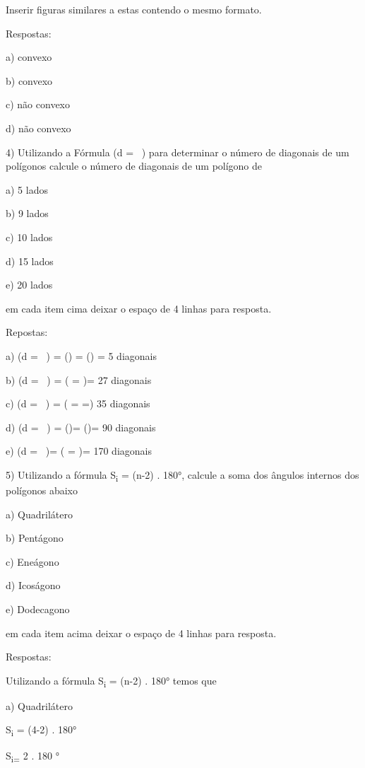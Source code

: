 Inserir figuras similares a estas contendo o mesmo formato.

Respostas:

a) convexo

b) convexo

c) não convexo

d) não convexo

4) Utilizando a Fórmula (d = \ ) para determinar o
número de diagonais de um polígonos calcule o número de diagonais de um
polígono de

a) 5 lados

b) 9 lados

c) 10 lados

d) 15 lados

e) 20 lados

em cada item cima deixar o espaço de 4 linhas para resposta.

Repostas:


a) (d = \ ) = () =
() = 5 diagonais

b) (d = \ ) = ( = )=
27 diagonais

c) (d = \ ) =
( =  =) 35 diagonais

d) (d = \ ) = ()=
()= 90 diagonais

e) (d = \ )=
( = )= 170 diagonais

5) Utilizando a fórmula S\textsubscript{i} = (n-2) . 180°, calcule a
soma dos ângulos internos dos polígonos abaixo

a) Quadrilátero

b) Pentágono

c) Eneágono

d) Icoságono

e) Dodecagono

em cada item acima deixar o espaço de 4 linhas para resposta.

Respostas:

Utilizando a fórmula S\textsubscript{i} = (n-2) . 180° temos que

a) Quadrilátero

S\textsubscript{i} = (4-2) . 180°

S\textsubscript{i=} 2 . 180 °

